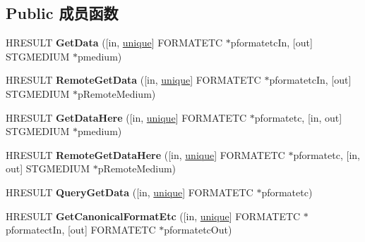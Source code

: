 \subsection*{Public 成员函数}
\begin{DoxyCompactItemize}
\item 
\mbox{\label{interface_i_data_object_ad8c0862b65eb940cfbfd4e3480c44179}} 
H\+R\+E\+S\+U\+LT {\bfseries Get\+Data} (\mbox{[}in, \hyperlink{interfaceunique}{unique}\mbox{]} F\+O\+R\+M\+A\+T\+E\+TC $\ast$pformatetc\+In, \mbox{[}out\mbox{]} S\+T\+G\+M\+E\+D\+I\+UM $\ast$pmedium)
\item 
\mbox{\label{interface_i_data_object_aec902ba203670617764c221b02131f7e}} 
H\+R\+E\+S\+U\+LT {\bfseries Remote\+Get\+Data} (\mbox{[}in, \hyperlink{interfaceunique}{unique}\mbox{]} F\+O\+R\+M\+A\+T\+E\+TC $\ast$pformatetc\+In, \mbox{[}out\mbox{]} S\+T\+G\+M\+E\+D\+I\+UM $\ast$p\+Remote\+Medium)
\item 
\mbox{\label{interface_i_data_object_a43ba93fe5cb4f0675a76c1628d18142c}} 
H\+R\+E\+S\+U\+LT {\bfseries Get\+Data\+Here} (\mbox{[}in, \hyperlink{interfaceunique}{unique}\mbox{]} F\+O\+R\+M\+A\+T\+E\+TC $\ast$pformatetc, \mbox{[}in, out\mbox{]} S\+T\+G\+M\+E\+D\+I\+UM $\ast$pmedium)
\item 
\mbox{\label{interface_i_data_object_ae95c2bc830d1999685061b950a12a67d}} 
H\+R\+E\+S\+U\+LT {\bfseries Remote\+Get\+Data\+Here} (\mbox{[}in, \hyperlink{interfaceunique}{unique}\mbox{]} F\+O\+R\+M\+A\+T\+E\+TC $\ast$pformatetc, \mbox{[}in, out\mbox{]} S\+T\+G\+M\+E\+D\+I\+UM $\ast$p\+Remote\+Medium)
\item 
\mbox{\label{interface_i_data_object_adec691dacffd456c4c01ff776f92d8b6}} 
H\+R\+E\+S\+U\+LT {\bfseries Query\+Get\+Data} (\mbox{[}in, \hyperlink{interfaceunique}{unique}\mbox{]} F\+O\+R\+M\+A\+T\+E\+TC $\ast$pformatetc)
\item 
\mbox{\label{interface_i_data_object_ae0d3c69ab917379fa41aa6023a8d6fcd}} 
H\+R\+E\+S\+U\+LT {\bfseries Get\+Canonical\+Format\+Etc} (\mbox{[}in, \hyperlink{interfaceunique}{unique}\mbox{]} F\+O\+R\+M\+A\+T\+E\+TC $\ast$pformatect\+In, \mbox{[}out\mbox{]} F\+O\+R\+M\+A\+T\+E\+TC $\ast$pformatetc\+Out)

\end{DoxyCompactItemize}

